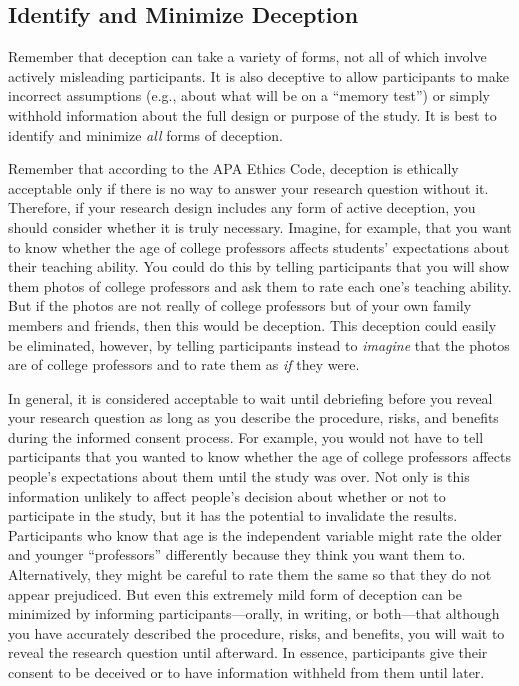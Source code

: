 \documentclass[
]{krantz}
\begin{document}
\subsection*{Identify and Minimize Deception}\label{identify-and-minimize-deception}


Remember that deception can take a variety of forms, not all of which involve actively misleading participants. It is also deceptive to allow participants to make incorrect assumptions (e.g., about what will be on a ``memory test'') or simply withhold information about the full design or purpose of the study. It is best to identify and minimize \emph{all} forms of deception.

Remember that according to the APA Ethics Code, deception is ethically acceptable only if there is no way to answer your research question without it. Therefore, if your research design includes any form of active deception, you should consider whether it is truly necessary. Imagine, for example, that you want to know whether the age of college professors affects students' expectations about their teaching ability. You could do this by telling participants that you will show them photos of college professors and ask them to rate each one's teaching ability. But if the photos are not really of college professors but of your own family members and friends, then this would be deception. This deception could easily be eliminated, however, by telling participants instead to \emph{imagine} that the photos are of college professors and to rate them as \emph{if} they were.

In general, it is considered acceptable to wait until debriefing before you reveal your research question as long as you describe the procedure, risks, and benefits during the informed consent process. For example, you would not have to tell participants that you wanted to know whether the age of college professors affects people's expectations about them until the study was over. Not only is this information unlikely to affect people's decision about whether or not to participate in the study, but it has the potential to invalidate the results. Participants who know that age is the independent variable might rate the older and younger ``professors'' differently because they think you want them to. Alternatively, they might be careful to rate them the same so that they do not appear prejudiced. But even this extremely mild form of deception can be minimized by informing participants---orally, in writing, or both---that although you have accurately described the procedure, risks, and benefits, you will wait to reveal the research question until afterward. In essence, participants give their consent to be deceived or to have information withheld from them until later.
\end{document}
